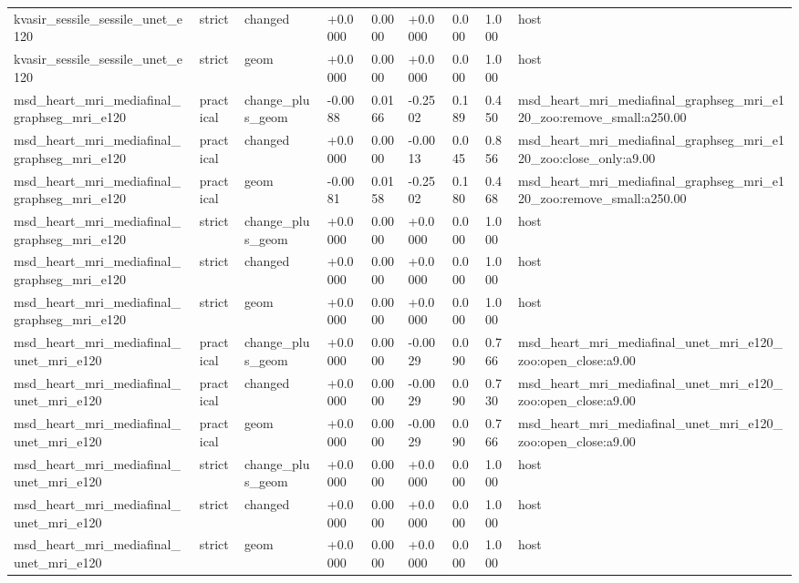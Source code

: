 \begin{table}[t]
\begin{tabular}{lllllllll}
kvasir\_sessile\_sessile\_unet\_e120 & strict & changed & +0.0000 & 0.0000 & +0.0000 & 0.000 & 1.000 & host \\
kvasir\_sessile\_sessile\_unet\_e120 & strict & geom & +0.0000 & 0.0000 & +0.0000 & 0.000 & 1.000 & host \\
msd\_heart\_mri\_mediafinal\_graphseg\_mri\_e120 & practical & change\_plus\_geom & -0.0088 & 0.0166 & -0.2502 & 0.189 & 0.450 & msd\_heart\_mri\_mediafinal\_graphseg\_mri\_e120\_zoo:remove\_small:a250.00 \\
msd\_heart\_mri\_mediafinal\_graphseg\_mri\_e120 & practical & changed & +0.0000 & 0.0000 & -0.0013 & 0.045 & 0.856 & msd\_heart\_mri\_mediafinal\_graphseg\_mri\_e120\_zoo:close\_only:a9.00 \\
msd\_heart\_mri\_mediafinal\_graphseg\_mri\_e120 & practical & geom & -0.0081 & 0.0158 & -0.2502 & 0.180 & 0.468 & msd\_heart\_mri\_mediafinal\_graphseg\_mri\_e120\_zoo:remove\_small:a250.00 \\
msd\_heart\_mri\_mediafinal\_graphseg\_mri\_e120 & strict & change\_plus\_geom & +0.0000 & 0.0000 & +0.0000 & 0.000 & 1.000 & host \\
msd\_heart\_mri\_mediafinal\_graphseg\_mri\_e120 & strict & changed & +0.0000 & 0.0000 & +0.0000 & 0.000 & 1.000 & host \\
msd\_heart\_mri\_mediafinal\_graphseg\_mri\_e120 & strict & geom & +0.0000 & 0.0000 & +0.0000 & 0.000 & 1.000 & host \\
msd\_heart\_mri\_mediafinal\_unet\_mri\_e120 & practical & change\_plus\_geom & +0.0000 & 0.0000 & -0.0029 & 0.090 & 0.766 & msd\_heart\_mri\_mediafinal\_unet\_mri\_e120\_zoo:open\_close:a9.00 \\
msd\_heart\_mri\_mediafinal\_unet\_mri\_e120 & practical & changed & +0.0000 & 0.0000 & -0.0029 & 0.090 & 0.730 & msd\_heart\_mri\_mediafinal\_unet\_mri\_e120\_zoo:open\_close:a9.00 \\
msd\_heart\_mri\_mediafinal\_unet\_mri\_e120 & practical & geom & +0.0000 & 0.0000 & -0.0029 & 0.090 & 0.766 & msd\_heart\_mri\_mediafinal\_unet\_mri\_e120\_zoo:open\_close:a9.00 \\
msd\_heart\_mri\_mediafinal\_unet\_mri\_e120 & strict & change\_plus\_geom & +0.0000 & 0.0000 & +0.0000 & 0.000 & 1.000 & host \\
msd\_heart\_mri\_mediafinal\_unet\_mri\_e120 & strict & changed & +0.0000 & 0.0000 & +0.0000 & 0.000 & 1.000 & host \\
msd\_heart\_mri\_mediafinal\_unet\_mri\_e120 & strict & geom & +0.0000 & 0.0000 & +0.0000 & 0.000 & 1.000 & host \\

\end{tabular}
\end{table}
